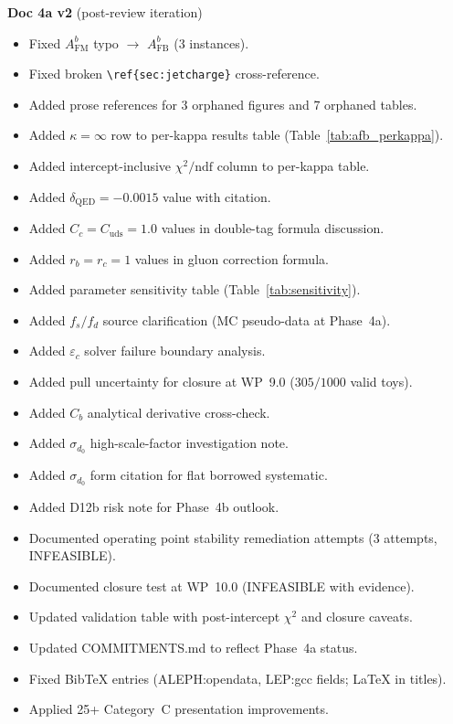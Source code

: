 \documentclass[11pt,a4paper]{article}
\begin{document}
\textbf{Doc 4a v2} (post-review iteration)
\begin{itemize}
\item Fixed $A_\mathrm{FM}^b$ typo $\to$ $A_\mathrm{FB}^b$ (3 instances).
\item Fixed broken \texttt{\textbackslash ref\{sec:jetcharge\}} cross-reference.
\item Added prose references for 3 orphaned figures and 7 orphaned tables.
\item Added $\kappa = \infty$ row to per-kappa results table (Table~\ref{tab:afb_perkappa}).
\item Added intercept-inclusive $\chi^2/\mathrm{ndf}$ column to per-kappa table.
\item Added $\delta_\mathrm{QED} = -0.0015$ value with citation.
\item Added $C_c = C_\mathrm{uds} = 1.0$ values in double-tag formula discussion.
\item Added $r_b = r_c = 1$ values in gluon correction formula.
\item Added parameter sensitivity table (Table~\ref{tab:sensitivity}).
\item Added $f_s/f_d$ source clarification (MC pseudo-data at Phase~4a).
\item Added $\varepsilon_c$ solver failure boundary analysis.
\item Added pull uncertainty for closure at WP~9.0 ($305/1000$ valid toys).
\item Added $C_b$ analytical derivative cross-check.
\item Added $\sigma_{d_0}$ high-scale-factor investigation note.
\item Added $\sigma_{d_0}$ form citation for flat borrowed systematic.
\item Added D12b risk note for Phase~4b outlook.
\item Documented operating point stability remediation attempts (3 attempts, INFEASIBLE).
\item Documented closure test at WP~10.0 (INFEASIBLE with evidence).
\item Updated validation table with post-intercept $\chi^2$ and closure caveats.
\item Updated COMMITMENTS.md to reflect Phase~4a status.
\item Fixed BibTeX entries (ALEPH:opendata, LEP:gcc fields; LaTeX in titles).
\item Applied 25+ Category~C presentation improvements.
\end{itemize}
\end{document}
